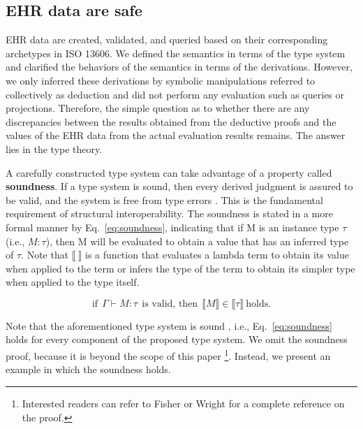\documentclass[preprint,3p,onecolumn,times,review]{elsarticle}
\begin{document}
\subsection{EHR data are safe}


EHR data are created, validated, and queried based on their corresponding archetypes in ISO 13606. We defined the semantics in terms of the type system and clarified the behaviors of the semantics in terms of the derivations. However, we only inferred these derivations by symbolic manipulations referred to collectively as deduction and did not perform any evaluation such as queries or projections. Therefore, the simple question as to whether there are any discrepancies between the results obtained from the deductive proofs and the values of the EHR data from the actual evaluation results remains. The answer lies in the type theory.

A carefully constructed type system can take advantage of a property called {\bf soundness}.
If a type system is sound, then every derived judgment is assured to be valid, and the system is free from type errors \cite{mitchell00:_found_progr_languag,cardelli04:_type_system}.
This is the fundamental requirement of structural interoperability.
The soundness is stated in a more formal manner \cite[p.12]{cardelli04:_type_system} by Eq.~\ref{eq:soundness}, indicating that if M is an instance type $\tau$ (i.e., $M : \tau$), then M will be evaluated to obtain a value that has an inferred type of $\tau$.
Note that $\llbracket ~ \rrbracket$ is a function that evaluates a lambda term to obtain its value when applied to the term or infers the type of the term to obtain its simpler type when applied to the type itself.

\begin{equation}
  \label{eq:soundness}
  \text{if} ~~ \Gamma \vdash M : \tau ~~\text{is valid, then}~~ \llbracket M \rrbracket \in \llbracket \tau \rrbracket ~\text{holds.}
\end{equation}

Note that the aforementioned type system is sound \cite{gunter92:_seman_progr_languag,wright94:_syntac_approac_to_type_sound}, i.e., Eq.~\ref{eq:soundness} holds for every component of the proposed type system. We omit the soundness proof, because it is beyond the scope of this paper \footnote{Interested readers can refer to Fisher \cite{fisher94:_lambd_calcul_objec_method_special} or Wright \cite{wright94:_syntac_approac_to_type_sound} for a complete reference on the proof.}. Instead, we present an example in which the soundness holds.
\end{document}
